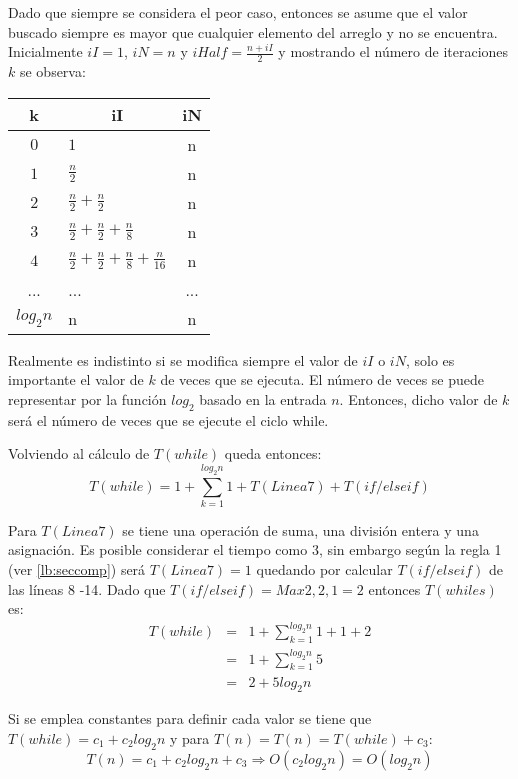 Dado que siempre se considera el peor caso, entonces se asume que el valor buscado siempre es mayor que cualquier elemento del arreglo y no se encuentra. Inicialmente $iI =1$, $iN = n$ y $iHalf = \frac{n+iI}{2}$ y mostrando el número de iteraciones $k$ se observa: 

\begin{table}[h]
\centering
\begin{tabular}{clc}
\hline
k    & \multicolumn{1}{c}{iI} & iN                     \\ \hline
$0$    & $1$                      & n                     \\
$1$    & $\frac{n}{2}$                    & n                     \\
$2$    & $\frac{n}{2} + \frac{n}{2}$              & n                     \\
$3$    & $\frac{n}{2} + \frac{n}{2} + \frac{n}{8}$        & n                     \\
$4$    & $\frac{n}{2} + \frac{n}{2} + \frac{n}{8} + \frac{n}{16}$ & n \\
...  & ...                    & ...                   \\
$log_2n$ & n                      & n
\end{tabular}
\end{table}

Realmente es indistinto si se modifica siempre el valor de $iI$ o $iN$, solo es importante el valor de $k$ de veces que se ejecuta. El número de veces se puede representar por la función $log_2$ basado en la entrada $n$. Entonces, dicho valor de $k$ será el número de veces que se ejecute el ciclo while.

Volviendo al cálculo de $T(while)$ queda entonces:
$$T(while) = 1 + \sum_{k=1}^{log_2n}{1 + T(Linea 7) + T(if/elseif)}$$

Para $T(Linea 7)$ se tiene una operación de suma, una división entera y una asignación. Es posible considerar el tiempo como 3, sin embargo según la regla 1 (ver \ref{lb:seccomp}) será $T(Linea 7) = 1$ quedando por calcular $T(if/elseif)$ de las líneas 8 -14. Dado que $T(if/elseif) = Max{2, 2, 1} = 2$ entonces $T(whiles)$ es:
\begin{eqnarray*}
T(while)&=&1 + \sum_{k=1}^{log_2n}{1 + 1 + 2}\\
&=&1 + \sum_{k=1}^{log_2n}{5}\\
&=&2 + 5 log_2n
\end{eqnarray*}

Si se emplea constantes para definir cada valor se tiene que $T(while) = c_1 + c_2 log_2n$ y para $T(n) = T(n) = T(while) + c_3$:
$$T(n) = c_1 + c_2 log_2n + c_3 \Rightarrow O(c_2 log_2n) = O(log_2n)$$

